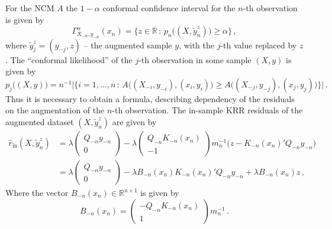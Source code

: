 \documentclass[a4paper]{article}
\newcommand{\Real}{\mathbb{R}}
\begin{document}
For the NCM $A$ the $1-\alpha$ conformal confidence interval for the $n$-th observation
is given by
\begin{equation} \label{eq:conf_ci}
\Gamma_{X_{-n}, y_{-n}}^\alpha(x_n)
  = \bigl\{ z\in \Real \,:\, p_n\bigl((X, \tilde{y}_n^z)\bigr) \geq \alpha \bigr\}
  \,,
\end{equation}
where $\tilde{y}_j^z = (y_{-j}, z)$ -- the augmented sample $y$, with the $j$-th
value replaced by $z$. The ``conformal likelihood'' of the $j$-th observation in
some sample $(X, y)$ is given by
\begin{equation*}
  p_j\bigl((X, y)\bigr)
    = n^{-1} \bigl\lvert \bigl\{ i = 1,\ldots, n \, : \,
        A\bigl((X_{-i}, y_{-i}), (x_i, y_i)\bigr)
        \geq A\bigl((X_{-j}, y_{-j}), (x_j, y_j)\bigr)
      \bigr\} \bigr\rvert
    \,.
\end{equation*}
Thus it is necessary to obtain a formula, describing dependency of the residuals on
the augmentation of the $n$-th observation. The in-sample KRR residuals of the augmented
dataset $(X, \tilde{y}_n^z)$ are given by
\begin{align}
    \hat{r}_{\text{in}}(X, \tilde{y}_n^z)
    &= \lambda \begin{pmatrix} Q_{-n} y_{-n} \\ 0 \end{pmatrix}
     - \lambda \begin{pmatrix} Q_{-n} K_{-n}(x_n) \\ -1 \end{pmatrix}
       m_n^{-1} \bigl(z - K_{-n}(x_n)' Q_{-n} y_{-n} \bigr) \label{eq:krr_in_resid} \\
    &= \lambda \begin{pmatrix} Q_{-n} y_{-n} \\ 0 \end{pmatrix}
     - \lambda B_{-n}(x_n) K_{-n}(x_n)' Q_{-n} y_{-n}
     + \lambda B_{-n}(x_n) z  \nonumber\,,
\end{align}
Where the vector $B_{-n}(x_n)\in\Real^{n\times 1}$ is given by
\begin{equation*}
  B_{-n}(x_n)
    = \begin{pmatrix} - Q_{-n} K_{-n}(x_n) \\ 1 \end{pmatrix} m_n^{-1}
    \,.
\end{equation*}
\end{document}
